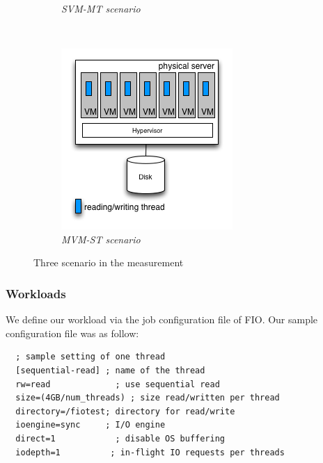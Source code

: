 \documentclass{acmsig}
\begin{document}
\begin{figure}[t]
\begin{subfigure}[b]{0.3\textwidth}
     \caption{\textit{SVM-MT scenario}}
     \label{fig:svm-mt}
   \end{subfigure}
    ~ %
   \begin{subfigure}[b]{0.3\textwidth}
     \includegraphics[width=\textwidth]{figures/MVM-ST.png}
     \caption{\textit{MVM-ST scenario}}
     \label{fig:mvm-st}
   \end{subfigure}
   \caption{Three scenario in the measurement}\label{fig:scenario}
\end{figure}

\subsubsection{Workloads}
We define our workload via the job configuration file of FIO. Our sample configuration file was as follow:
\begin{lstlisting}
  ; sample setting of one thread
  [sequential-read] ; name of the thread
  rw=read             ; use sequential read
  size=(4GB/num_threads) ; size read/written per thread
  directory=/fiotest; directory for read/write
  ioengine=sync     ; I/O engine
  direct=1            ; disable OS buffering
  iodepth=1          ; in-flight IO requests per threads
\end{lstlisting}
\end{document}
